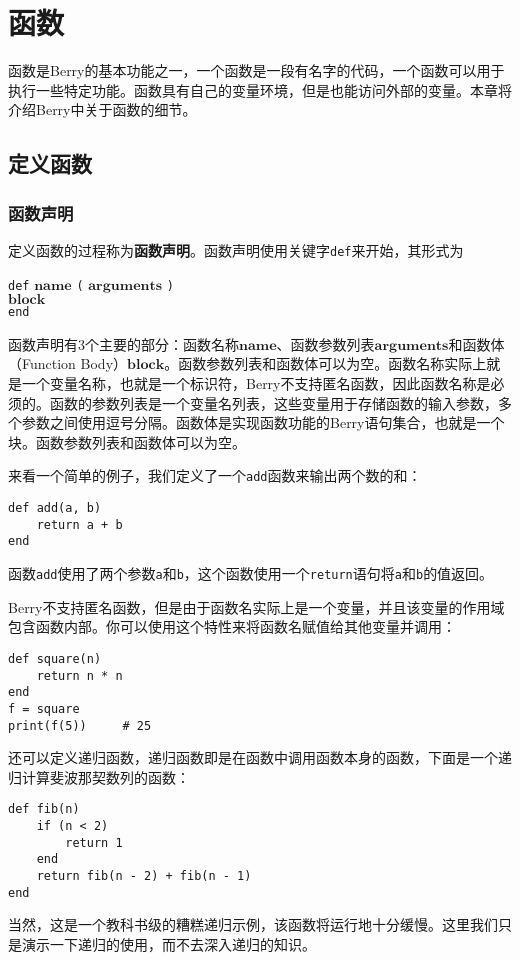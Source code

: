 \chapter{函数}

函数是Berry的基本功能之一，一个函数是一段有名字的代码，一个函数可以用于执行一些特定功能。函数具有自己的变量环境，但是也能访问外部的变量。本章将介绍Berry中关于函数的细节。

\section{定义函数}

\subsection{函数声明}

定义函数的过程称为\textbf{函数声明}。函数声明使用关键字\texttt{def}来开始，其形式为
\begin{algorithm}
    \texttt{def} $\bm{name}$ \texttt{(} $\bm{arguments}$ \texttt{)} \\
        \qquad $\bm{block}$ \\
    \texttt{end}
\end{algorithm}

函数声明有3个主要的部分：函数名称$\bm{name}$、函数参数列表$\bm{arguments}$和函数体（Function Body）$\bm{block}$。函数参数列表和函数体可以为空。函数名称实际上就是一个变量名称，也就是一个标识符，Berry不支持匿名函数，因此函数名称是必须的。函数的参数列表是一个变量名列表，这些变量用于存储函数的输入参数，多个参数之间使用逗号分隔。函数体是实现函数功能的Berry语句集合，也就是一个块。函数参数列表和函数体可以为空。

来看一个简单的例子，我们定义了一个\texttt{add}函数来输出两个数的和：
\begin{lstlisting}[language=berry, numbers=none]
def add(a, b)
    return a + b
end
\end{lstlisting}

函数\texttt{add}使用了两个参数\texttt{a}和\texttt{b}，这个函数使用一个\texttt{return}语句将\texttt{a}和\texttt{b}的值返回。

Berry不支持匿名函数，但是由于函数名实际上是一个变量，并且该变量的作用域包含函数内部。你可以使用这个特性来将函数名赋值给其他变量并调用：
\begin{lstlisting}[language=berry, numbers=none]
def square(n)
    return n * n
end
f = square
print(f(5))     # 25
\end{lstlisting}
还可以定义递归函数，递归函数即是在函数中调用函数本身的函数，下面是一个递归计算斐波那契数列的函数：
\begin{lstlisting}[language=berry, numbers=none]
def fib(n)
    if (n < 2)
        return 1
    end
    return fib(n - 2) + fib(n - 1)
end
\end{lstlisting}
当然，这是一个教科书级的糟糕递归示例，该函数将运行地十分缓慢。这里我们只是演示一下递归的使用，而不去深入递归的知识。

